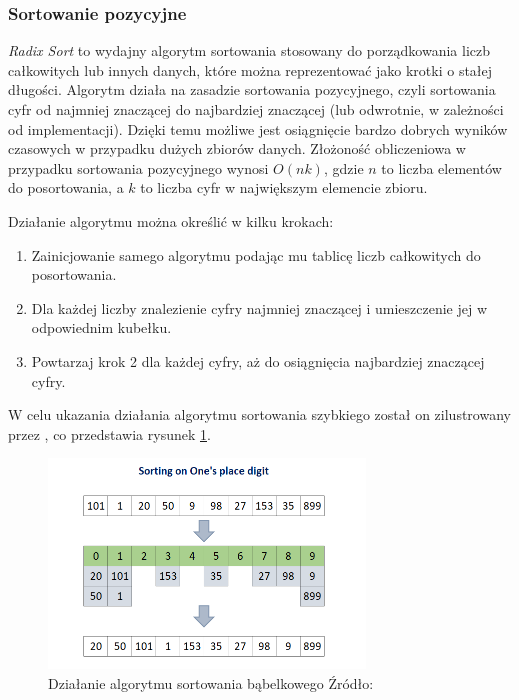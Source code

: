 \subsubsection*{Sortowanie pozycyjne}
\textit{Radix Sort} to wydajny algorytm sortowania stosowany do porządkowania liczb całkowitych lub innych danych, które można reprezentować jako krotki o stałej długości. Algorytm działa na zasadzie sortowania pozycyjnego, czyli sortowania cyfr od najmniej znaczącej do najbardziej znaczącej (lub odwrotnie, w zależności od implementacji). Dzięki temu możliwe jest osiągnięcie bardzo dobrych wyników czasowych w przypadku dużych zbiorów danych. Złożoność obliczeniowa w przypadku sortowania pozycyjnego wynosi $O(nk)$, gdzie $n$ to liczba elementów do posortowania, a $k$ to liczba cyfr w największym elemencie zbioru.

Działanie algorytmu można określić w kilku krokach:
\begin{enumerate}
  \item Zainicjowanie samego algorytmu podając mu tablicę liczb całkowitych do posortowania.
  \item Dla każdej liczby znalezienie cyfry najmniej znaczącej i umieszczenie jej w odpowiednim kubełku.
  \item Powtarzaj krok 2 dla każdej cyfry, aż do osiągnięcia najbardziej znaczącej cyfry.
\end{enumerate}

W celu ukazania działania algorytmu sortowania szybkiego został on zilustrowany przez \cite{radix_sort}, co przedstawia rysunek \ref{fig:radix_sort}.

\begin{figure}[H]
  \centering
  \includegraphics[width=0.75\textwidth]{Figures/radix_sort.png}
  \caption{Działanie algorytmu sortowania bąbelkowego Źródło: \cite{radix_sort}}
  \label{fig:radix_sort}
\end{figure}

